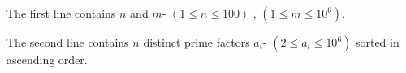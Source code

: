The first line contains $n$ and $m$- $(1 \le n \le 100)$ , $(1 \le m \le 10^6)$.

The second line contains $n$ distinct prime factors $a_i$- $(2 \le a_i \le 10^6)$
sorted in ascending order.
